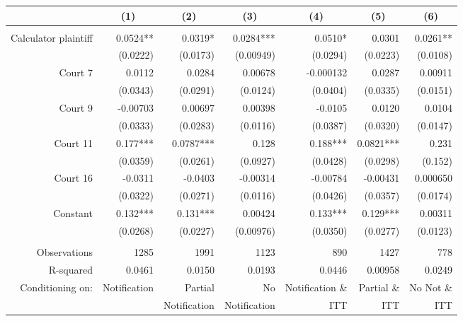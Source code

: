 \begin{tabular}{rrrrrrr}
\toprule
\multicolumn{1}{c}{} & \multicolumn{1}{c}{(1)} & \multicolumn{1}{c}{(2)} & \multicolumn{1}{c}{(3)} & \multicolumn{1}{c}{(4)} & \multicolumn{1}{c}{(5)} & \multicolumn{1}{c}{(6)} \\
\midrule
      &       &       &       &       &       &  \\
Calculator plaintiff & 0.0524** & 0.0319* & 0.0284*** & 0.0510* & 0.0301 & 0.0261** \\
      & (0.0222) & (0.0173) & (0.00949) & (0.0294) & (0.0223) & (0.0108) \\
Court 7 & 0.0112 & 0.0284 & 0.00678 & -0.000132 & 0.0287 & 0.00911 \\
      & (0.0343) & (0.0291) & (0.0124) & (0.0404) & (0.0335) & (0.0151) \\
Court 9 & -0.00703 & 0.00697 & 0.00398 & -0.0105 & 0.0120 & 0.0104 \\
      & (0.0333) & (0.0283) & (0.0116) & (0.0387) & (0.0320) & (0.0147) \\
Court 11 & 0.177*** & 0.0787*** & 0.128 & 0.188*** & 0.0821*** & 0.231 \\
      & (0.0359) & (0.0261) & (0.0927) & (0.0428) & (0.0298) & (0.152) \\
Court 16 & -0.0311 & -0.0403 & -0.00314 & -0.00784 & -0.00431 & 0.000650 \\
      & (0.0322) & (0.0271) & (0.0116) & (0.0426) & (0.0357) & (0.0174) \\
Constant  & 0.132*** & 0.131*** & 0.00424 & 0.133*** & 0.129*** & 0.00311 \\
      & (0.0268) & (0.0227) & (0.00976) & (0.0350) & (0.0277) & (0.0123) \\
      &       &       &       &       &       &  \\
Observations & 1285  & 1991  & 1123  & 890   & 1427  & 778 \\
R-squared & 0.0461 & 0.0150 & 0.0193 & 0.0446 & 0.00958 & 0.0249 \\
Conditioning on:   & Notification & Partial & No    & Notification \&  & Partial \&  & No Not \& \\
      &       & Notification & Notification & ITT   & ITT   & ITT \\
\bottomrule
\end{tabular}%
